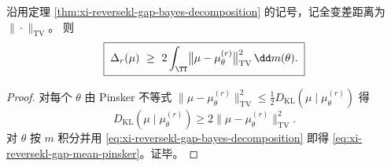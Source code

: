 \begin{corollary}\label{cor:xi-reversekl-gap-mean-pinsker}
沿用定理 \ref{thm:xi-reversekl-gap-bayes-decomposition} 的记号，记全变差距离为 \(\|\cdot\|_{\mathrm{TV}}\)。
则
\begin{equation}\label{eq:xi-reversekl-gap-mean-pinsker}
\boxed{\;
\Delta_r(\mu)\ \ge\ 2\int_{\TT}\bigl\|\mu-\mu_\theta^{(r)}\bigr\|_{\mathrm{TV}}^{2}\,\dd m(\theta).\;}
\end{equation}
\end{corollary}
\begin{proof}
对每个 \(\theta\) 由 Pinsker 不等式
\(
\|\mu-\mu_\theta^{(r)}\|_{\mathrm{TV}}^2\le \tfrac12 D_{\mathrm{KL}}(\mu\mid \mu_\theta^{(r)})
\)
得
\[
D_{\mathrm{KL}}(\mu\mid \mu_\theta^{(r)})\ge 2\|\mu-\mu_\theta^{(r)}\|_{\mathrm{TV}}^2.
\]
对 \(\theta\) 按 \(m\) 积分并用 \eqref{eq:xi-reversekl-gap-bayes-decomposition} 即得 \eqref{eq:xi-reversekl-gap-mean-pinsker}。证毕。
\end{proof}

\endinput

